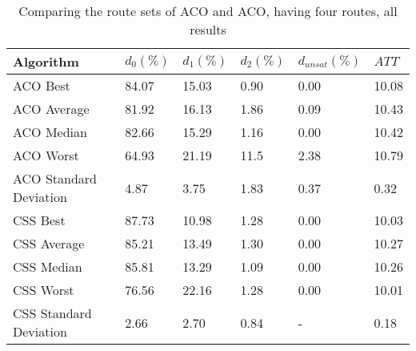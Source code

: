     \begin{table}[H]
    \centering
    \begin{tabular}{|l||l|l|l|l|l|}
    \hline
    Algorithm & $d_0(\%)$ & $d_1(\%)$ & $d_2(\%)$ & $d_{unsat}(\%)$ & $ATT$ \\
    \hline
    ACO Best & 84.07 & 15.03 & 0.90 & 0.00 & 10.08\\
    ACO Average & 81.92 & 16.13 & 1.86 & 0.09 & 10.43\\
    ACO Median & 82.66 & 15.29 & 1.16 & 0.00 & 10.42\\
    ACO Worst & 64.93 & 21.19 & 11.5 & 2.38 & 10.79\\
    ACO Standard Deviation & 4.87 & 3.75 & 1.83 & 0.37 & 0.32\\
    \hline
    \hline
    CSS Best & 87.73 & 10.98 & 1.28 & 0.00 & 10.03\\
    CSS Average & 85.21 & 13.49 & 1.30 & 0.00 & 10.27\\
    CSS Median & 85.81 & 13.29 & 1.09 & 0.00 & 10.26\\
    CSS Worst & 76.56 & 22.16 & 1.28 & 0.00 & 10.01\\
    CSS Standard Deviation & 2.66 & 2.70 & 0.84 & - & 0.18\\
    \hline
    \end{tabular}
    \caption {Comparing the route sets of ACO and ACO, having four routes, all results}
    \label{table:performanceComparison_ACOFull}
    \end{table}


